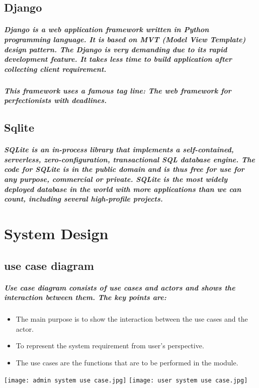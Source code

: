 \documentclass[12pt]{report}
\begin{document}
        \section{Django}
        \paragraph
        {
        Django is a web application framework written in Python programming language. It is based on MVT (Model View Template) design pattern. The Django is very demanding due to its rapid development feature. It takes less time to build application after collecting client requirement.
        }
        \paragraph
        {
        This framework uses a famous tag line: The web framework for perfectionists with deadlines.
        }
        \section{Sqlite}
        \paragraph
        {
        SQLite is an in-process library that implements a self-contained, serverless, zero-configuration, transactional SQL database engine. The code for SQLite is in the public domain and is thus free for use for any purpose, commercial or private. SQLite is the most widely deployed database in the world with more applications than we can count, including several high-profile projects.
        }
    \chapter{System Design}
        \section{use case diagram}
        \paragraph
        {
        Use case diagram consists of use cases and actors and shows the interaction between them. The key points are: }
        \begin{itemize}
            \item The main purpose is to show the interaction between the use cases and the actor.
            \item To represent the system requirement from user’s perspective. 
            \item The use cases are the functions that are to be performed in the module. 
        \end{itemize}
        \begin{center}
            \texttt{[image: admin system use case.jpg]}
            \texttt{[image: user system use case.jpg]}
        \end{center}
\end{document}

